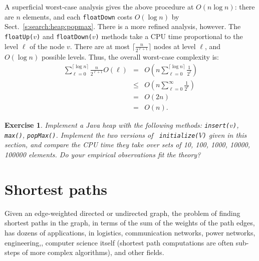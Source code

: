 \documentclass[a4paper]{book}
\theoremstyle{changebreak}                %
\newtheorem{ex}[result]{Exercise}
\begin{document}
A superficial worst-case analysis gives the above procedure at
$O(n\log n)$: there are $n$ elements, and each {\tt floatDown} costs
$O(\log n)$ by Sect.~\ref{s:search:heap:popmax}. There is a more
refined analysis, however. The {\tt floatUp($v$)}
and {\tt floatDown($v$)} methods take a CPU
time proportional to the level $\ell$ of the
node $v$. There are at most
$\lceil\frac{n}{2^{\ell+1}}\rceil$ nodes at level $\ell$, and $O(\log
n)$ possible levels. Thus, the overall worst-case complexity is:
\begin{eqnarray*}
  \sum_{\ell=0}^{\lceil\log n\rceil}\frac{n}{2^{\ell+1}} O(\ell) &=& 
  O\left(n \sum_{\ell=0}^{\lceil\log n\rceil}\frac{1}{2^{\ell}}\right) \\
  &\le& O\left(n \sum_{\ell=0}^{\infty}\frac{1}{2^{\ell}}\right) \\
  &=& O(2n) \\ &=& O(n).
\end{eqnarray*}

\begin{ex}
Implement a Java heap with the following methods: {\tt insert($v$)}, {\tt
  max()}, {\tt popMax()}. Implement the two versions of {\tt
  initialize($V$)} given in this section, and compare the CPU time
they take over sets of 10, 100, 1000, 10000, 100000 elements. Do your
empirical observations fit the theory?
\end{ex}


\chapter{Shortest paths}
\label{c:path}

\begin{center}
\end{center}

Given an edge-weighted directed or undirected
graph, the problem of
finding shortest paths in the graph, in terms of
the sum of the weights of the path
edges, has dozens of applications, in
logistics, communication
networks, power
networks, engineering,,
computer science itself (shortest path
computations are often sub-steps of more
complex algorithms), and other fields.
\end{document}

